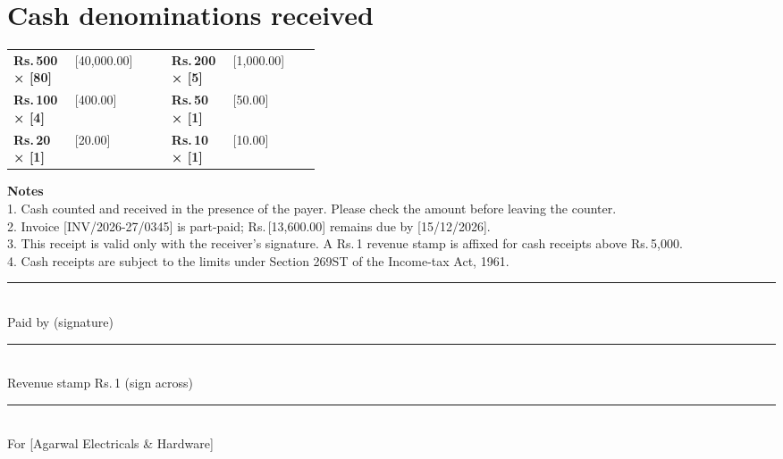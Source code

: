 \documentclass[10pt]{article}
\begin{document}
\section{Cash denominations received}

\begin{tabularx}{\linewidth}{@{}p{0.2\linewidth}X p{0.2\linewidth}X@{}}
\textbf{Rs.\,500 × [80]} & [40,000.00] & \textbf{Rs.\,200 × [5]} & [1,000.00] \\
\textbf{Rs.\,100 × [4]} & [400.00] & \textbf{Rs.\,50 × [1]} & [50.00] \\
\textbf{Rs.\,20 × [1]} & [20.00] & \textbf{Rs.\,10 × [1]} & [10.00] \\
\end{tabularx}\par\vspace{2pt}

\noindent\colorbox{notebg}{\parbox{\dimexpr\linewidth-2\fboxsep}{\footnotesize {\color{accent}\bfseries Notes}\\ 1. Cash counted and received in the presence of the payer. Please check the amount before leaving the counter.\\ 2. Invoice [INV/2026-27/0345] is part-paid; Rs.\,[13,600.00] remains due by [15/12/2026].\\ 3. This receipt is valid only with the receiver's signature. A Rs.\,1 revenue stamp is affixed for cash receipts above Rs.\,5,000.\\ 4. Cash receipts are subject to the limits under Section 269ST of the Income-tax Act, 1961.}}\par\vspace{6pt}

\vspace{32pt}\noindent\parbox[t]{0.3\linewidth}{\centering\rule{\linewidth}{0.5pt}\\ Paid by (signature)}\hfill\parbox[t]{0.3\linewidth}{\centering\rule{\linewidth}{0.5pt}\\ Revenue stamp Rs.\,1 (sign across)}\hfill\parbox[t]{0.3\linewidth}{\centering\rule{\linewidth}{0.5pt}\\ For [Agarwal Electricals \& Hardware]}\par
\end{document}
